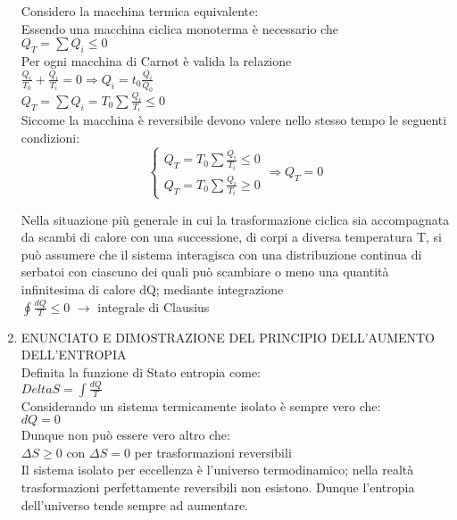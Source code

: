 \documentclass[8pt]{scrreprt}
\begin{document}
\begin{multicols*}{2}
\begin{enumerate}
\vspace{20mm}
Considero la macchina termica equivalente:\\

\vspace{10mm}
Essendo una macchina ciclica monoterma è necessario che\\ 
$Q_T = \sum Q_i \leq 0$\\
Per ogni macchina di Carnot è valida la relazione \\
$\frac{Q_i}{T_0} + \frac{Q_i}{T_i} = 0 \Rightarrow Q_i = t_0 \frac{Q_i}{Q_0}$\\
$Q_T = \sum Q_i = T_0 \sum \frac{Q_i}{T_i} \leq 0$\\
Siccome la macchina è reversibile devono valere nello stesso tempo le seguenti condizioni:\\
\begin{equation*}
\begin{cases}
Q_T = T_0 \sum \frac{Q_i}{T_i} \leq 0\\
Q_T = T_0 \sum \frac{Q_i}{T_i} \geq 0
\end{cases} \Rightarrow Q_T = 0
\end{equation*}

Nella situazione più generale in cui la trasformazione ciclica sia accompagnata da scambi di calore con una successione, di corpi a diversa temperatura T, si può assumere che il sistema interagisca con una distribuzione continua di serbatoi con ciascuno dei quali può scambiare o meno una quantità infinitesima di calore dQ; mediante integrazione \\
$\oint \frac{dQ}{T} \leq 0$ $\rightarrow$ integrale di Clausius

\item ENUNCIATO E DIMOSTRAZIONE DEL PRINCIPIO DELL’AUMENTO DELL’ENTROPIA\\
Definita la funzione di Stato entropia come:\\
$DeltaS = \int \frac{dQ}{T}$\\
Considerando un sistema termicamente isolato è sempre vero che:\\
$dQ = 0$\\
Dunque non può essere vero altro che:\\
$\Delta S \geq 0$ con $\Delta S = 0$ per trasformazioni reversibili\\
Il sistema isolato per eccellenza è l’universo termodinamico; nella realtà trasformazioni perfettamente reversibili non esistono. Dunque l’entropia dell’universo tende sempre ad aumentare.


\end{enumerate}
\end{multicols*}
\end{document}
